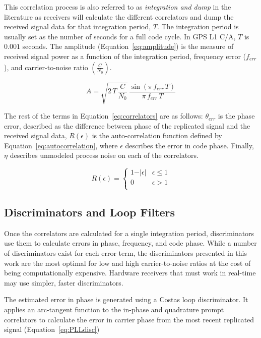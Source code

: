 This correlation process is also referred to as \textit{integration and dump} in the literature as receivers will calculate the different correlators and dump the received signal data for that integration period, \(T\). The integration period is usually set as the number of seconds for a full code cycle. In GPS L1 C/A, \(T\) is \(0.001\) seconds. The amplitude (Equation~\ref{eq:amplitude}) is the measure of received signal power as a function of the integration period, frequency error (\(f_{err}\)), and carrier-to-noise ratio \(\left(\frac{C}{N_0}\right)\).

\begin{equation}\label{eq:amplitude}
    A = \sqrt{2\,T\,\frac{C}{N_0}}\, \frac{\sin\left(\pi \, f_{err} \, T \right)}{\pi \, f_{err} \, T}
\end{equation}

The rest of the terms in Equation~\ref{eq:correlators} are as follows: \(\theta_{err}\) is the phase error, described as the difference between phase of the replicated signal and the received signal data, \(R(\epsilon)\) is the auto-correlation function defined by Equation~\ref{eq:autocorrelation}, where \(\epsilon \) describes the error in code phase. Finally, \(\eta \) describes unmodeled process noise on each of the correlators.

\begin{equation}\label{eq:autocorrelation}
    R(\epsilon) =
    \begin{cases}
        1 - \vert \epsilon \vert & \epsilon \leq 1 \\
        0                        & \epsilon > 1    \\
    \end{cases}
\end{equation}

\subsection{Discriminators and Loop Filters}
Once the correlators are calculated for a single integration period, discriminators use them to calculate errors in phase, frequency, and code phase. While a number of discriminators exist for each error term, the discriminators presented in this work are the most optimal for low and high carrier-to-noise ratios at the cost of being computationally expensive. Hardware receivers that must work in real-time may use simpler, faster discriminators.

The estimated error in phase is generated using a Costas loop discriminator. It applies an arc-tangent function to the in-phase and quadrature prompt correlators to calculate the error in carrier phase from the most recent replicated signal (Equation~\ref{eq:PLLdisc})

